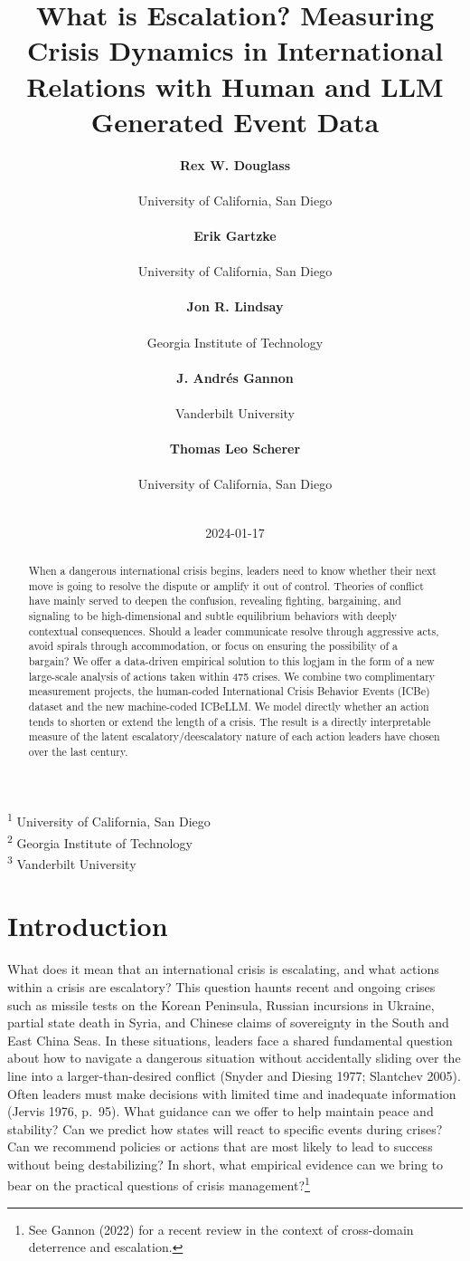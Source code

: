 \documentclass[
]{article}
\title{What is Escalation? Measuring Crisis Dynamics in International
Relations with Human and LLM Generated Event Data}
\author{\textbf{Rex W. Douglass}\\\\University of California, San
Diego\\\\\asep\textbf{Erik Gartzke}\\\\University of California, San
Diego\\\\\asep\textbf{Jon R. Lindsay}\\\\Georgia Institute of
Technology\\\\\asep\textbf{J. Andrés Gannon}\\\\Vanderbilt
University\\\\\asep\textbf{Thomas Leo Scherer}\\\\University of
California, San Diego\\\\}
\date{2024-01-17}
\begin{document}
\maketitle
\begin{abstract}
When a dangerous international crisis begins, leaders need to know
whether their next move is going to resolve the dispute or amplify it
out of control. Theories of conflict have mainly served to deepen the
confusion, revealing fighting, bargaining, and signaling to be
high-dimensional and subtle equilibrium behaviors with deeply contextual
consequences. Should a leader communicate resolve through aggressive
acts, avoid spirals through accommodation, or focus on ensuring the
possibility of a bargain? We offer a data-driven empirical solution to
this logjam in the form of a new large-scale analysis of actions taken
within 475 crises. We combine two complimentary measurement projects,
the human-coded International Crisis Behavior Events (ICBe) dataset and
the new machine-coded ICBeLLM. We model directly whether an action tends
to shorten or extend the length of a crisis. The result is a directly
interpretable measure of the latent escalatory/deescalatory nature of
each action leaders have chosen over the last century.
\end{abstract}

\textsuperscript{1} University of California, San Diego\\
\textsuperscript{2} Georgia Institute of Technology\\
\textsuperscript{3} Vanderbilt University

\section{Introduction}\label{introduction}

What does it mean that an international crisis is escalating, and what
actions within a crisis are escalatory? This question haunts recent and
ongoing crises such as missile tests on the Korean Peninsula, Russian
incursions in Ukraine, partial state death in Syria, and Chinese claims
of sovereignty in the South and East China Seas. In these situations,
leaders face a shared fundamental question about how to navigate a
dangerous situation without accidentally sliding over the line into a
larger-than-desired conflict (Snyder and Diesing 1977; Slantchev 2005).
Often leaders must make decisions with limited time and inadequate
information (Jervis 1976, p.~95). What guidance can we offer to help
maintain peace and stability? Can we predict how states will react to
specific events during crises? Can we recommend policies or actions that
are most likely to lead to success without being destabilizing? In
short, what empirical evidence can we bring to bear on the practical
questions of crisis management?\footnote{See Gannon (2022) for a recent
  review in the context of cross-domain deterrence and escalation.}
\end{document}
